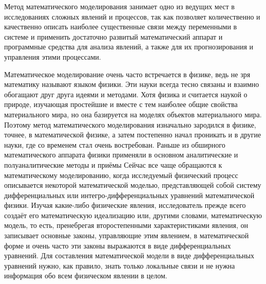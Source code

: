 \documentclass[12pt, a4paper]{extarticle}
\numberwithin{equation}{section}
\begin{document}
Метод математического моделирования занимает одно из ведущих мест в исследованиях сложных явлений и процессов, так как позволяет количественно и качественно описать наиболее существенные связи между переменными в системе и применить достаточно развитый математический аппарат и программные средства для анализа явлений, а также для их прогнозирования и управления этими процессами. 

Математическое моделирование очень часто встречается в физике, ведь не зря математику называют языком физики. Эти науки всегда тесно связаны и взаимно обогащают друг друга идеями и методами. Хотя физика и считается наукой о природе, изучающая простейшие и вместе с тем наиболее общие свойства материального мира, но она базируется на моделях объектов материального мира. Поэтому метод математического моделирования изначально зародился в физике, точнее, в математической физике, а затем постепенно начал проникать и в другие науки, где со временем стал очень востребован. Раньше из обширного математического аппарата физики применяли в основном аналитические и полуаналитические методы и приёмы Сейчас все чаще обращаются к математическому моделированию, когда исследуемый физический процесс описывается некоторой математической моделью, представляющей собой систему дифференциальных или интегро-дифференциальных уравнений математической физики. Изучая какие-либо физические явления, исследователь прежде всего создаёт его математическую идеализацию или, другими словами, математическую модель, то есть, пренебрегая второстепенными характеристиками явления, он записывает основные законы, управляющие этим явлением, в математической форме и очень часто эти законы выражаются в виде дифференциальных уравнений. Для составления математической модели в виде дифференциальных уравнений нужно, как правило, знать только локальные связи и не нужна информация обо всем физическом явлении в целом.
\end{document}
